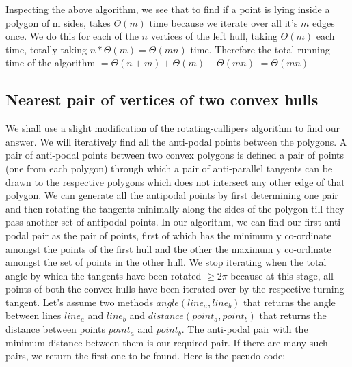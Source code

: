 \documentclass{article}
\begin{document}
Inspecting the above algorithm, we see that to find if a point is lying inside a polygon of m sides, takes $\Theta (m)$ time because we iterate over all it's $m$ edges once. We do this for each of the $n$ vertices of the left hull, taking $\Theta (m)$ each time, totally taking $n*\Theta(m) = \Theta(mn)$ time.
\newline
Therefore the total running time of the algorithm $= \Theta(n+m) + \Theta(m) + \Theta(mn)$ \newline $= \Theta(mn)$

\newpage
\subsection{Nearest pair of vertices of two convex hulls}

We shall use a slight modification of the rotating-callipers algorithm to find our answer. We will iteratively find all the anti-podal points between the polygons. A pair of anti-podal points between two convex polygons is defined a pair of points (one from each polygon) through which a pair of anti-parallel tangents can be drawn to the respective polygons which does not intersect any other edge of that polygon. We can generate all the antipodal points by first determining one pair and then rotating the tangents minimally along the sides of the polygon till they pass another set of antipodal points. In our algorithm, we can find our first anti-podal pair as the pair of points, first of which has the minimum y co-ordinate amongst the points of the first hull and the other the maximum y co-ordinate amongst the set of points in the other hull. We stop iterating when the total angle by which the tangents have been rotated $\geq 2\pi$ because at this stage, all points of both the convex hulls have been iterated over by the respective turning tangent. Let's assume two methods $angle(line_a, line_b)$ that returns the angle between lines $line_a$ and $line_b$ and $distance(point_a, point_b)$ that returns the distance between points $point_a$ and $point_b$. The anti-podal pair with the minimum distance between them is our required pair. If there are many such pairs, we return the first one to be found.
\newline 
Here is the pseudo-code:
\newline
\end{document}
